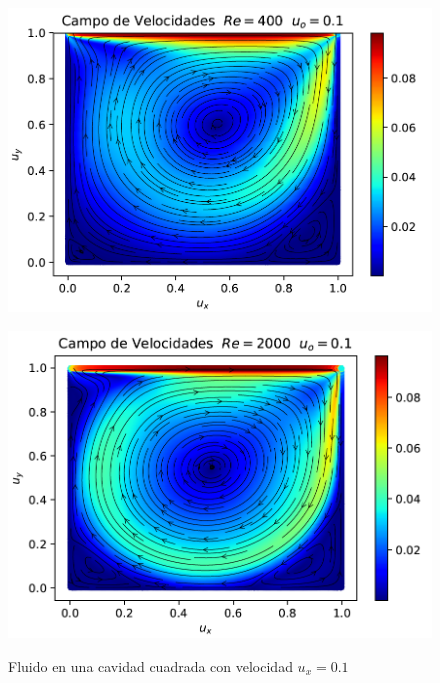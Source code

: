 \begin{figure}[H]
\label{fig:Cavidad}
  \centering
  \begin{minipage}[b]{0.4\textwidth}
    \label{cavidadRe400}
    \includegraphics[scale =0.25]{cavidadRE400.png}
  \end{minipage}
  \hspace{1cm}
  \begin{minipage}[b]{0.4\textwidth}
  \label{cavidadRe2000}
    \includegraphics[scale=0.25]{cavidadRE200.png}
  \end{minipage}
  \caption{Fluido en una cavidad cuadrada con velocidad $u_{x} = 0.1$}
\end{figure}

